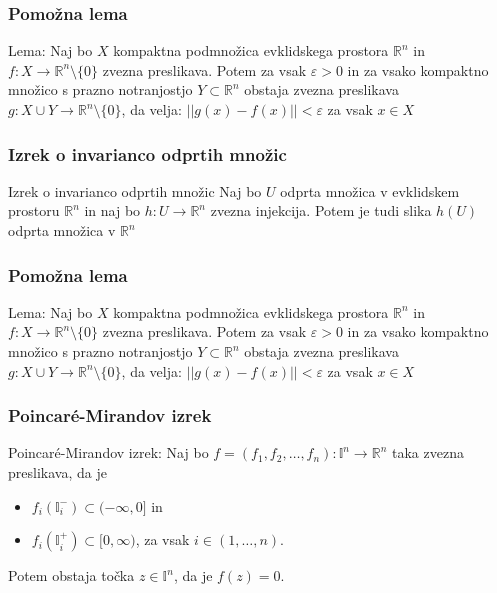 \documentclass[t]{beamer} %
\begin{document}
\begin{frame}
\frametitle{Pomožna lema}
\begin{block}{Lema:}
Naj bo $X$ kompaktna podmnožica evklidskega prostora $\mathbb{R}^n$ in $f : X \rightarrow \mathbb{R}^n \setminus \{0\} $ zvezna preslikava. Potem za vsak $\varepsilon > 0$ in za vsako kompaktno množico s prazno notranjostjo $Y \subset \mathbb{R}^n$ obstaja zvezna preslikava $g : X \cup Y \rightarrow \mathbb{R}^n \setminus \{0\}$, da velja: $||g(x)-f(x)|| < \varepsilon$  za vsak $x \in X$
\end{block}
\end{frame}

\begin{frame}
\frametitle{Izrek o invarianco odprtih množic}
\begin{block}{Izrek o invarianco odprtih množic}
Naj bo $U$ odprta množica v evklidskem prostoru $\mathbb{R}^n$ in naj bo $h : U \rightarrow \mathbb{R}^n$ zvezna injekcija. Potem je tudi slika $h(U)$ odprta množica v $\mathbb{R}^n$
\end{block}
\end{frame}

\begin{frame}
\frametitle{Pomožna lema}
\begin{block}{Lema:}
Naj bo $X$ kompaktna podmnožica evklidskega prostora $\mathbb{R}^n$ in $f : X \rightarrow \mathbb{R}^n \setminus \{0\} $ zvezna preslikava. Potem za vsak $\varepsilon > 0$ in za vsako kompaktno množico s prazno notranjostjo $Y \subset \mathbb{R}^n$ obstaja zvezna preslikava $g : X \cup Y \rightarrow \mathbb{R}^n \setminus \{0\}$, da velja: $||g(x)-f(x)|| < \varepsilon$  za vsak $x \in X$
\end{block}
\end{frame}

\begin{frame}
\frametitle{Poincar\'{e}-Mirandov izrek}
\begin{block}{Poincar\'{e}-Mirandov izrek:}
Naj bo $f = (f_1, f_2, \dots, f_n) : \mathbb{I}^n \rightarrow \mathbb{R}^n$ taka zvezna preslikava, da je 
\begin{itemize}
\item $f_i (\mathbb{I}_i ^-) \subset (-\infty, 0]$ in
\item $f_i (\mathbb{I}_i ^+) \subset [0, \infty)$, za vsak $i \in (1, \dots, n)$.
\end{itemize}
Potem obstaja točka $z\in \mathbb{I}^n$, da je $f(z) = 0$.
\end{block}
\end{frame}
\end{document}
